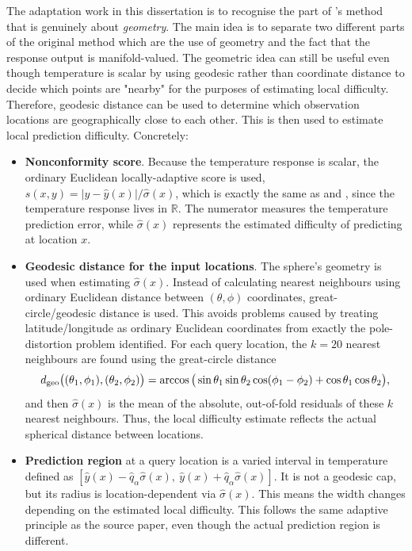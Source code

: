 The adaptation work in this dissertation is to recognise the part of \citet{amirishahbazi2026}'s method that is genuinely about \emph{geometry}. The main idea is to separate two different parts of the original method which are the use of geometry and the fact that the response output is manifold-valued. The geometric idea can still be useful even though temperature is scalar by using geodesic rather than coordinate distance to decide which points are "nearby" for the purposes of estimating local difficulty. Therefore, geodesic distance can be used to determine which observation locations are geographically close to each other. This is then used to estimate local prediction difficulty. Concretely:

\begin{itemize}
    \item \textbf{Nonconformity score}. Because the temperature response is scalar, the ordinary Euclidean locally-adaptive score is used, $s(x,y) = |y-\hat y(x)| / \hat\sigma(x)$, which is exactly the same as \citet{lei2018} and \citet{romano2019}, since the temperature response lives in $\mathbb{R}$. The numerator measures the temperature prediction error, while $\hat\sigma(x)$ represents the estimated difficulty of predicting at location $x$. 

    \item \textbf{Geodesic distance for the input locations}. The sphere's geometry is used when estimating $\hat\sigma(x)$. Instead of calculating nearest neighbours using ordinary Euclidean distance between $(\theta,\phi)$ coordinates, great-circle/geodesic distance is used. This avoids problems caused by treating latitude/longitude as ordinary Euclidean coordinates from exactly the pole-distortion problem \citeauthor{amirishahbazi2026} identified. For each query location, the $k=20$ nearest neighbours are found using the great-circle distance
    \begin{equation}
        d_{\mathrm{geo}}\big((\theta_1,\phi_1),(\theta_2,\phi_2)\big) = \arccos\big(\sin\theta_1\sin\theta_2\cos(\phi_1-\phi_2) + \cos\theta_1\cos\theta_2\big),
        \label{eq:geo-input}
    \end{equation}and then $\hat\sigma(x)$ is the mean of the absolute, out-of-fold residuals of these $k$ nearest neighbours. Thus, the local difficulty estimate reflects the actual spherical distance between locations. 

    \item  \textbf{Prediction region} at a query location is a varied interval in temperature defined as $[\hat y(x) - \hat q_\alpha \hat\sigma(x),\ \hat y(x) + \hat q_\alpha \hat\sigma(x)]$. It is not a geodesic cap, but its radius is location-dependent via $\hat\sigma(x)$. This means the width changes depending on the estimated local difficulty. This follows the same adaptive principle as the source paper, even though the actual prediction region is different. 
\end{itemize}

